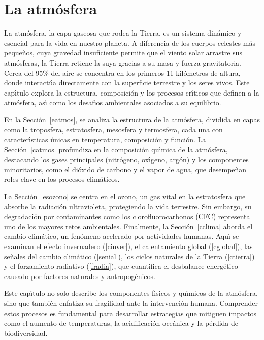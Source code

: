 \chapter{La atm\'osfera}
 
La atm\'osfera, la capa gaseosa que rodea la Tierra, es un sistema din\'amico y esencial para la vida en nuestro planeta. A diferencia de los cuerpos celestes m\'as peque\~nos, cuya gravedad insuficiente permite que el viento solar arrastre sus atm\'osferas, la Tierra retiene la suya gracias a su masa y fuerza gravitatoria. Cerca del 95\% del aire se concentra en los primeros 11 kil\'ometros de altura, donde interact\'ua directamente con la superficie terrestre y los seres vivos. Este cap\'{\i}tulo explora la estructura, composici\'on y los procesos cr\'{\i}ticos que definen a la atm\'osfera, as\'{\i} como los desaf\'{\i}os ambientales asociados a su equilibrio.

En la  Secci\'on~\ref{eatmos}, se analiza la estructura de la atm\'osfera, dividida en capas como la troposfera, estratosfera, mesosfera y termosfera, cada una con caracter\'{\i}sticas \'unicas en temperatura, composici\'on y funci\'on. La Secci\'on~\ref{catmos} profundiza en la composici\'on qu\'{\i}mica de la atm\'osfera, destacando los gases principales (nitr\'ogeno, ox\'{\i}geno, arg\'on) y los componentes minoritarios, como el di\'oxido de carbono y el vapor de agua, que desempe\~nan roles clave en los procesos clim\'aticos.

La Secci\'on~\ref{esozono} se centra en el ozono, un gas vital en la estratosfera que absorbe la radiaci\'on ultravioleta, protegiendo la vida terrestre. Sin embargo, su degradaci\'on por contaminantes como los clorofluorocarbonos (\gls{CFC}) representa uno de los mayores retos ambientales. Finalmente, la Secci\'on~\ref{cclima} aborda el cambio clim\'atico, un fen\'omeno acelerado por actividades humanas. Aqu\'{\i} se examinan el efecto invernadero (\ref{cinver}), el calentamiento global (\ref{cglobal}), las se\~nales del cambio clim\'atico (\ref{senial}), los ciclos naturales de la Tierra (\ref{ctierra}) y el forzamiento radiativo (\ref{fradia}), que cuantifica el desbalance energ\'etico causado por factores naturales y antropog\'enicos.

Este cap\'{\i}tulo no solo describe los componentes f\'{\i}sicos y qu\'{\i}micos de la atm\'osfera, sino que tambi\'en enfatiza su fragilidad ante la intervenci\'on humana. Comprender estos procesos es fundamental para desarrollar estrategias que mitiguen impactos como el aumento de temperaturas, la acidificaci\'on oce\'anica y la p\'erdida de biodiversidad.

